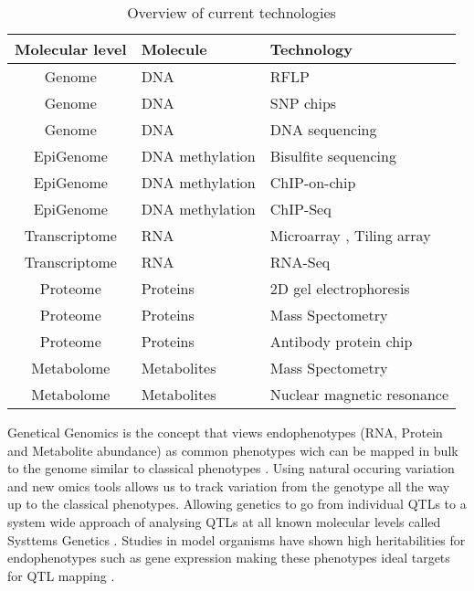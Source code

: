 \begin{table}[h]
  \centering
  {\footnotesize
  \begin{tabular}{ | c | l | l | }
    \hline
    {\bf Molecular level} & {\bf Molecule} & {\bf Technology}\\
    \hline
    \hline
\rowcolor{gray!35}    Genome          & DNA                & RFLP \cite{Lander:1986} \\
\rowcolor{gray!35}    Genome          & DNA                & SNP chips \cite{Hacia:1999} \\
\rowcolor{gray!35}    Genome          & DNA                & DNA sequencing \cite{Mardis:2008} \\
    \hline
    EpiGenome       & DNA methylation    & Bisulfite sequencing \cite{Hayatsu:2007} \\
    EpiGenome       & DNA methylation    & ChIP-on-chip \cite{Collas:2010} \\
    EpiGenome       & DNA methylation    & ChIP-Seq \cite{Park:2009} \\
    \hline
    \hline
\rowcolor{gray!35}    Transcriptome   & RNA          & Microarray \cite{Lashkari:1997}, Tiling array \cite{Lee:2013} \\
\rowcolor{gray!35}    Transcriptome   & RNA          & RNA-Seq \cite{Wang:2009}\\
    \hline
    Proteome        & Proteins     & 2D gel electrophoresis \cite{O'Farrell:1975}\\
    Proteome        & Proteins     & Mass Spectometry \cite{Deshaies:2001}\\
    Proteome        & Proteins     & Antibody protein chip \cite{Fasolo:2009} \\
    \hline
\rowcolor{gray!35}    Metabolome      & Metabolites  & Mass Spectometry \cite{Aebersold:2003} \\
\rowcolor{gray!35}    Metabolome      & Metabolites  & Nuclear magnetic resonance \cite{Espina:2009} \\
    \hline
  \end{tabular}
  }
  \caption{Overview of current technologies}
\end{table}

Genetical Genomics is the concept that views endophenotypes (RNA, Protein and Metabolite abundance) 
as common phenotypes wich can be mapped in bulk to the genome similar to classical 
phenotypes \cite{Jansen:2001a}. Using natural occuring variation and new omics tools allows us 
to track variation from the genotype all the way up to the classical phenotypes. Allowing 
genetics to go from individual QTLs to a system wide approach of analysing QTLs at all known 
molecular levels called Systtems Genetics \cite{Threadgill:2006}. Studies in model organisms 
have shown high heritabilities for endophenotypes such as gene expression making these phenotypes 
ideal targets for QTL mapping \cite{Brem:2002}. 

